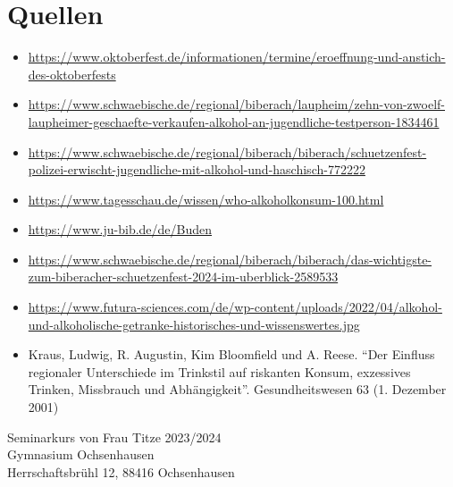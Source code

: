\documentclass[12pt]{article}
\begin{document}
\section{Quellen}
\footnotesize

\begin{itemize}
    \item \url{https://www.oktoberfest.de/informationen/termine/eroeffnung-und-anstich-des-oktoberfests}
    \item \url{https://www.schwaebische.de/regional/biberach/laupheim/zehn-von-zwoelf-laupheimer-geschaefte-verkaufen-alkohol-an-jugendliche-testperson-1834461}
    \item \url{https://www.schwaebische.de/regional/biberach/biberach/schuetzenfest-polizei-erwischt-jugendliche-mit-alkohol-und-haschisch-772222}
    \item \url{https://www.tagesschau.de/wissen/who-alkoholkonsum-100.html}
    \item \url{https://www.ju-bib.de/de/Buden}
    \item \url{https://www.schwaebische.de/regional/biberach/biberach/das-wichtigste-zum-biberacher-schuetzenfest-2024-im-uberblick-2589533}
    \item \url{https://www.futura-sciences.com/de/wp-content/uploads/2022/04/alkohol-und-alkoholische-getranke-historisches-und-wissenswertes.jpg}
    \item Kraus, Ludwig, R. Augustin, Kim Bloomfield und A. Reese. “Der Einfluss regionaler Unterschiede im Trinkstil auf riskanten Konsum, exzessives Trinken, Missbrauch und Abhängigkeit”. Gesundheitswesen 63 (1. Dezember 2001)
\end{itemize}
\begin{center}
    \vspace{2cm}
    Seminarkurs von Frau Titze 2023/2024\\
    Gymnasium Ochsenhausen\\
    Herrschaftsbrühl 12, 88416 Ochsenhausen\\

\end{center}
\end{document}
